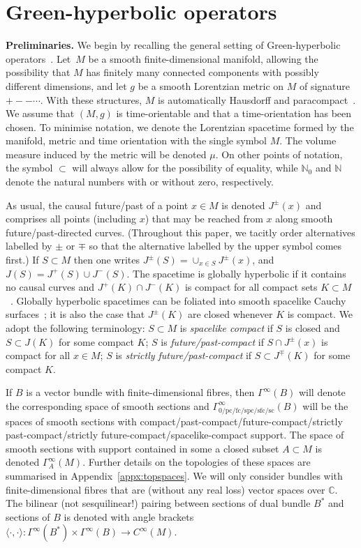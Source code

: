 \documentclass[11pt]{article}
\numberwithin{equation}{section}
\numberwithin{equation}{section}
\newcommand{\CC}{{\mathbb C}}
\newcommand{\NN}{{\mathbb N}}
\newcommand{\fc}{\mathrm{fc}}
\newcommand{\pc}{\mathrm{pc}}
\newcommand{\sfc}{\mathrm{sfc}}
\newcommand{\spc}{\mathrm{spc}}
\begin{document}
 \section{Green-hyperbolic operators}\label{sec:GHOs}

{\bf Preliminaries.}
 We begin by recalling the general setting of Green-hyperbolic operators~\cite{Baer:2015}. Let~$M$ be a smooth finite-dimensional manifold, allowing the possibility that $M$ has finitely many connected components with possibly different dimensions, and let $g$ be a smooth Lorentzian metric on $M$ of signature $+--\cdots$. With these structures, $M$ is automatically Hausdorff and paracompact~\cite{Geroch_spinorI:1968}.
 We assume that $(M,g)$ is time-orientable and that a time-orientation has been chosen. To minimise notation, we denote the Lorentzian spacetime formed by the manifold, metric and time orientation with the single symbol $M$. The volume measure induced by the metric will be denoted $\mu$. On other points of notation,
 the symbol $\subset$ will always allow for the possibility of equality, while $\NN_0$ and $\NN$ denote the natural numbers with or without zero, respectively.

 As usual, the causal future/past of a point $x\in M$ is denoted $J^\pm(x)$ and comprises all points (including $x$) that may be reached from $x$ along smooth future/past-directed curves. (Throughout this paper, we tacitly order alternatives labelled by $\pm$ or $\mp$ so that the alternative labelled by the upper symbol comes first.)
 If $S\subset M$ then one writes $J^\pm(S)=\cup_{x\in S} J^\pm(x)$, and $J(S)=J^+(S)\cup J^-(S)$. The spacetime is globally hyperbolic if it contains no causal curves and $J^+(K)\cap J^-(K)$ is compact for all compact sets $K\subset M$~\cite{Bernal:2006xf}. Globally hyperbolic spacetimes can be foliated into smooth spacelike Cauchy surfaces~\cite{Bernal:2004gm}; it is also the case that $J^\pm(K)$ are closed whenever $K$ is compact. We adopt the following terminology: $S\subset M$ is
 \emph{spacelike compact} if $S$ is closed and $S\subset J(K)$ for some compact $K$; $S$ is \emph{future/past-compact} if $S\cap J^{\pm}(x)$ is compact for all $x\in M$; $S$ is \emph{strictly future/past-compact} if
 $S\subset J^{\mp}(K)$ for some compact $K$.

 If $B$ is a vector bundle with finite-dimensional fibres, then $\Gamma^\infty(B)$ will denote the corresponding space of smooth sections and $\Gamma_{0/\pc/\fc/\spc/\sfc/\mathrm{sc}}^\infty(B)$ will be the spaces of smooth sections with com\-pact/past-compact/future-compact/strictly past-compact/strictly future-compact/space\-li\-ke-compact support. The space of smooth sections with support contained in some a closed subset $A\subset M$ is denoted $\Gamma^\infty_A(M)$. Further details on the topologies of these spaces are summarised in Appendix~\ref{appx:topspaces}. We will only consider bundles with finite-dimensional fibres that are (without any real loss) vector spaces over $\CC$. The bilinear (not sesquilinear!) pairing between sections of dual bundle $B^*$ and sections of $B$ is denoted with angle brackets $\langle \cdot,\cdot\rangle \colon \Gamma^\infty(B^*)\times \Gamma^\infty(B)\to C^\infty(M)$.
\end{document}
